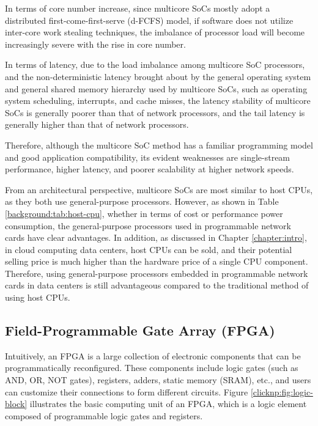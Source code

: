 In terms of core number increase, since multicore SoCs mostly adopt a distributed first-come-first-serve (d-FCFS) model, if software does not utilize inter-core work stealing techniques, the imbalance of processor load will become increasingly severe with the rise in core number.

In terms of latency, due to the load imbalance among multicore SoC processors, and the non-deterministic latency brought about by the general operating system and general shared memory hierarchy used by multicore SoCs, such as operating system scheduling, interrupts, and cache misses, the latency stability of multicore SoCs is generally poorer than that of network processors, and the tail latency is generally higher than that of network processors.

Therefore, although the multicore SoC method has a familiar programming model and good application compatibility, its evident weaknesses are single-stream performance, higher latency, and poorer scalability at higher network speeds.

From an architectural perspective, multicore SoCs are most similar to host CPUs, as they both use general-purpose processors. However, as shown in Table \ref{background:tab:host-cpu}, whether in terms of cost or performance power consumption, the general-purpose processors used in programmable network cards have clear advantages. In addition, as discussed in Chapter \ref{chapter:intro}, in cloud computing data centers, host CPUs can be sold, and their potential selling price is much higher than the hardware price of a single CPU component. Therefore, using general-purpose processors embedded in programmable network cards in data centers is still advantageous compared to the traditional method of using host CPUs.

\subsection{Field-Programmable Gate Array (FPGA)}

Intuitively, an FPGA is a large collection of electronic components that can be programmatically reconfigured. These components include logic gates (such as AND, OR, NOT gates), registers, adders, static memory (SRAM), etc., and users can customize their connections to form different circuits. Figure \ref{clicknp:fig:logic-block} illustrates the basic computing unit of an FPGA, which is a logic element composed of programmable logic gates and registers.

